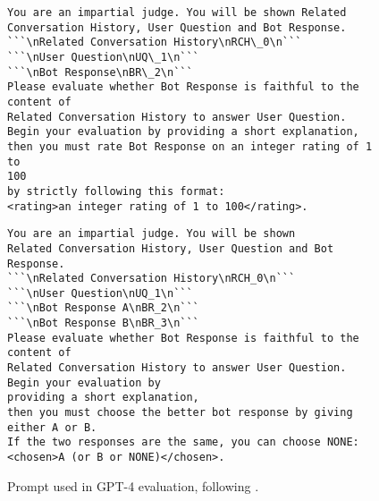 \begin{figure*}[htbp]
\small
\begin{tcolorbox}[left=3pt,right=3pt,top=3pt,bottom=3pt,title=\textbf{Single-Sample Score}]
\begin{verbatim}
You are an impartial judge. You will be shown Related
Conversation History, User Question and Bot Response.
```\nRelated Conversation History\nRCH\_0\n```
```\nUser Question\nUQ\_1\n```
```\nBot Response\nBR\_2\n```
Please evaluate whether Bot Response is faithful to the content of 
Related Conversation History to answer User Question. 
Begin your evaluation by providing a short explanation, 
then you must rate Bot Response on an integer rating of 1 to 
100 
by strictly following this format: 
<rating>an integer rating of 1 to 100</rating>.
\end{verbatim}
\end{tcolorbox}
\begin{tcolorbox}[left=3pt,right=3pt,top=3pt,bottom=3pt,title=\textbf{Pair-Wise Comparison}]
\begin{verbatim}
You are an impartial judge. You will be shown 
Related Conversation History, User Question and Bot Response.
```\nRelated Conversation History\nRCH_0\n```
```\nUser Question\nUQ_1\n```
```\nBot Response A\nBR_2\n```
```\nBot Response B\nBR_3\n```
Please evaluate whether Bot Response is faithful to the content of 
Related Conversation History to answer User Question. 
Begin your evaluation by 
providing a short explanation, 
then you must choose the better bot response by giving 
either A or B. 
If the two responses are the same, you can choose NONE:
<chosen>A (or B or NONE)</chosen>.
\end{verbatim}
\end{tcolorbox}
\caption{Prompt used in GPT-4 evaluation, following \citet{lu2023memochat}.}
\label{fig: prompt4eval}
\end{figure*}
